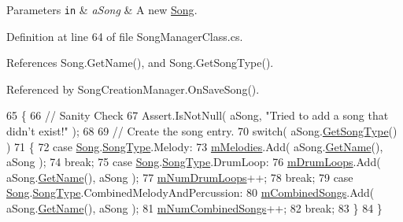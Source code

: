 \begin{DoxyParams}[1]{Parameters}
\mbox{\tt in}  & {\em a\+Song} & A new \hyperlink{class_song}{Song}. \\
\hline
\end{DoxyParams}


Definition at line 64 of file Song\+Manager\+Class.\+cs.



References Song.\+Get\+Name(), and Song.\+Get\+Song\+Type().



Referenced by Song\+Creation\+Manager.\+On\+Save\+Song().


\begin{DoxyCode}
65     \{
66         \textcolor{comment}{// Sanity Check}
67         Assert.IsNotNull( aSong, \textcolor{stringliteral}{"Tried to add a song that didn't exist!"} );
68 
69         \textcolor{comment}{// Create the song entry.}
70         \textcolor{keywordflow}{switch}( aSong.\hyperlink{group___song_pub_func_gabae5b5d8f727b2d9da7867a99347f86b}{GetSongType}() )
71         \{
72             \textcolor{keywordflow}{case} \hyperlink{class_song}{Song}.\hyperlink{group___song_enums_gae681a1f001333e39fc1cb4fea97bfe1b}{SongType}.Melody:
73                 \hyperlink{group___s_m_priv_var_ga935e80f645d0546003f7df8443b79242}{mMelodies}.Add( aSong.\hyperlink{group___song_pub_func_ga705c433f2bfb5aede337698144b23c8b}{GetName}(), aSong );
74                 \textcolor{keywordflow}{break};
75             \textcolor{keywordflow}{case} \hyperlink{class_song}{Song}.\hyperlink{group___song_enums_gae681a1f001333e39fc1cb4fea97bfe1b}{SongType}.DrumLoop:
76                 \hyperlink{group___s_m_priv_var_ga84f25335035755448d11acb9287360f2}{mDrumLoops}.Add( aSong.\hyperlink{group___song_pub_func_ga705c433f2bfb5aede337698144b23c8b}{GetName}(), aSong );
77                 \hyperlink{group___s_m_priv_var_ga0ea9b6c8343a9b2cbe0eb375edaef247}{mNumDrumLoops}++;
78                 \textcolor{keywordflow}{break};
79             \textcolor{keywordflow}{case} \hyperlink{class_song}{Song}.\hyperlink{group___song_enums_gae681a1f001333e39fc1cb4fea97bfe1b}{SongType}.CombinedMelodyAndPercussion:
80                 \hyperlink{group___s_m_priv_var_gaf6b4ff41b8da95d10ad3db62df111faa}{mCombinedSongs}.Add( aSong.\hyperlink{group___song_pub_func_ga705c433f2bfb5aede337698144b23c8b}{GetName}(), aSong );
81                 \hyperlink{group___s_m_priv_var_gae423c7b9efd0e2ef721820318200e5f9}{mNumCombinedSongs}++;
82                 \textcolor{keywordflow}{break};
83         \}
84     \}
\end{DoxyCode}
\mbox{\label{group___s_m_pub_func_ga87bd14c75666b13bd02510c5b7080784}} 
